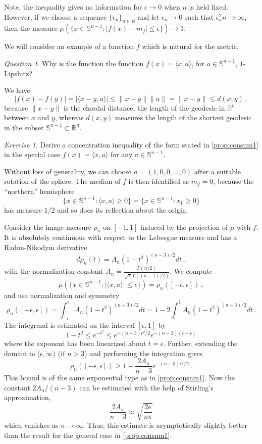 \documentclass[12pt]{article}
\theoremstyle{remark}
\newtheorem{exc}[thm]{Exercise}
\newtheorem{question}[thm]{Question}
\def\eps{\epsilon}
\def\Snm1{\mathbb S^{n-1}}
\def\Rn{\mathbb R^n}
\begin{document}
Note, the inequality gives no information for $\eps\to 0$ when $n$ is held fixed. However, if we choose a sequence $\{\eps_n\}_{n \in \mathbb N}$ and let $\epsilon_n \to 0$ such that $\eps_n^2 n \to \infty$, then the measure 
$\mu(\{x \in \Snm1: |f(x) - m_f| \le \eps\}) \to 1 .$

We will consider an example of a function $f$ which is natural for the metric. 

\begin{question} Why is the function the function $f(x)=\langle x, a\rangle$,
for $a \in \Snm1$,
 $1$-Lipshitz?
\end{question}
We have
$$
    |f(x)-f(y)| = |\langle x- y, a\rangle | \le \|x-y\| \|a \| = \|x-y\| \le d(x,y) \, , 
$$
because $\|x-y\|$ is the chordal distance, the length of the geodesic in $\Rn$ between $x$ and $y$,
whereas $d(x,y)$ measures the length of the shortest geodesic in the subset $\Snm1 \subset \Rn$.

\begin{exc} Derive a concentration inequality of the form stated in \ref{prop:consnm1} in the special case $f(x) = \langle x, a\rangle$
for any $ a \in \Snm1$.
\end{exc}

Without loss of generality, we can choose $a=(1, 0, 0, \dots, 0)$ after a suitable rotation of the sphere.
The median of $f$ is then identified as $m_f=0$, because the ``northern'' hemisphere
$$
  \{ x \in \Snm1: \langle x,a\rangle \ge 0\} =  \{ x \in \Snm1: x_1 \ge 0\}
$$
has measure $1/2$ and so does its reflection about the origin.

Consider the image measure $\rho_n$ on $[-1,1]$ induced by the projection of $\mu$ with $f$.
It is absolutely continuous with respect to the Lebesgue measure and has a Radon-Nikodym derivative
$$
   d\rho_n(t) = A_n (1-t^2)^{(n-3)/2} dt \, ,
$$
with the normalization constant $A_n = \frac{\Gamma(n/2)}{\sqrt \pi \Gamma((n-1)/2)}$.
We compute
$$
    \mu (\{ x \in \Snm1: |\langle x,a\rangle| \le \eps\}) = \rho_n([-\eps,\eps]) \, ,
$$
and use normalization and symmetry
$$
  \rho_n([-\eps,\eps]) = \int_{-\eps}^\eps A_n (1-t^2 )^{(n-3)/2} dt 
  = 1 - 2 \int_\eps^1 A_n (1-t^2)^{(n-3)/2} dt \, . 
$$
The integrand is estimated on the interval $[\eps,1]$ by
$$
   1-t^2 \le e^{- t^2} \le e^{-(n-3)\eps^2/2} e^{-(n-3)(t-\eps)}
$$
where the exponent has been linearized about $t=\eps$.
Further, extending the domain  to $[\eps, \infty)$ (if $n>3$) and performing the integration gives
$$
   \rho_n([-\eps,\eps]) \ge 1 - \frac{2 A_n}{n-3} e^{-(n-3)\eps^2/2}  \, .
$$
This bound is of the same exponential type as in \ref{prop:consnm1}.
Now the constant $2A_n/(n-3)$ can be estimated with the help of Stirling's approximation,
$$
   \frac{2 A_n}{n-3} \approx \sqrt{\frac{2 e}{ n \pi }}
$$
which vanishes as $n \to \infty$. Thus, this estimate is asymptotically slightly better than the result for the general
case in \ref{prop:consnm1}.
\end{document}
